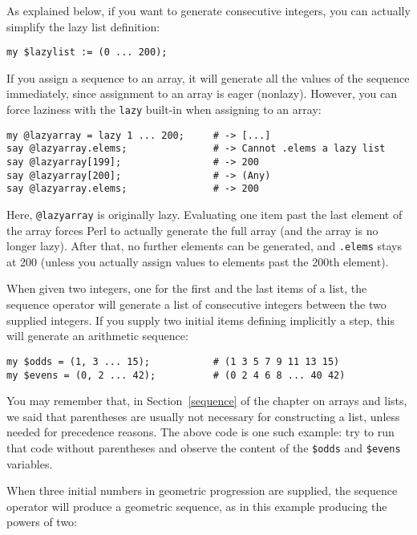 As explained below, if you want to generate consecutive 
integers, you can actually simplify the lazy list definition:

\begin{verbatim}
my $lazylist := (0 ... 200);
\end{verbatim}


If you assign a sequence to an array, it will generate 
all the values of the sequence immediately, since 
assignment to an array is eager (nonlazy).  However, 
you can force laziness with the  {\tt lazy} built-in 
when assigning to an array:

\begin{verbatim}
my @lazyarray = lazy 1 ... 200;     # -> [...]
say @lazyarray.elems;               # -> Cannot .elems a lazy list
say @lazyarray[199];                # -> 200
say @lazyarray[200];                # -> (Any)
say @lazyarray.elems;               # -> 200
\end{verbatim}

Here, \verb'@lazyarray' is originally lazy. 
Evaluating one item past the last element of the array 
forces Perl to actually generate the full array (and the 
array is no longer lazy). After that, no further elements 
can be generated, and {\tt .elems} stays at 200 (unless 
you actually assign values to elements past the 200th 
element).

When given two integers, one for the first and the last items of 
a list, the sequence operator will generate a list of consecutive 
integers between the two supplied integers. If you supply two 
initial items defining implicitly a step, this will generate 
an arithmetic sequence:

\begin{verbatim}
my $odds = (1, 3 ... 15);           # (1 3 5 7 9 11 13 15)
my $evens = (0, 2 ... 42);          # (0 2 4 6 8 ... 40 42)
\end{verbatim}

You may remember that, in Section~\ref{sequence} of the chapter 
on arrays and lists, we said that parentheses are usually not 
necessary for constructing a list, unless needed for 
precedence reasons. The above code is one such example: try 
to run that code without parentheses and observe the content 
of the \verb'$odds' and \verb'$evens' variables.

When three initial numbers in geometric progression are supplied, the 
sequence operator will produce a geometric sequence, as in 
this example producing the powers of two:

